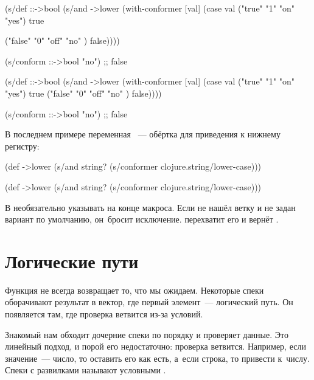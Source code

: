 \ifnarrow

\begin{clojure}
(s/def ::->bool
  (s/and
   ->lower
   (with-conformer [val]
     (case val
       ("true"  "1" "on"  "yes")
       true

       ("false" "0" "off" "no" )
       false))))

(s/conform ::->bool "no")
;; false
\end{clojure}

\else

\begin{clojure}
(s/def ::->bool
  (s/and
   ->lower
   (with-conformer [val]
     (case val
       ("true"  "1" "on"  "yes") true
       ("false" "0" "off" "no" ) false))))

(s/conform ::->bool "no")
;; false
\end{clojure}

\fi

\noindent
В последнем примере переменная ~--- обёртка для приведения к
нижнему регистру:

\ifnarrow

\begin{clojure}
(def ->lower
  (s/and
    string?
    (s/conformer
      clojure.string/lower-case)))
\end{clojure}

\else

\begin{clojure}
(def ->lower
  (s/and
    string?
    (s/conformer clojure.string/lower-case)))
\end{clojure}

\fi

В  необязательно указывать  на конце
макроса. Если  не нашёл ветку и не задан вариант по умолчанию,
он~бросит исключение.  перехватит его и вернёт
.

\section{Логические пути}


Функция  не всегда возвращает то, что мы ожидаем. Некоторые
спеки оборачивают результат в вектор, где первый элемент~--- логический путь. Он
появляется там, где проверка ветвится из-за условий.

Знакомый нам  обходит дочерние спеки по порядку и проверяет
данные. Это линейный подход, и порой его недостаточно: проверка
ветвится. Например, если значение~--- число, то оставить его как есть, а~если
строка, то привести к~числу. Спеки с развилками называют условными
.


